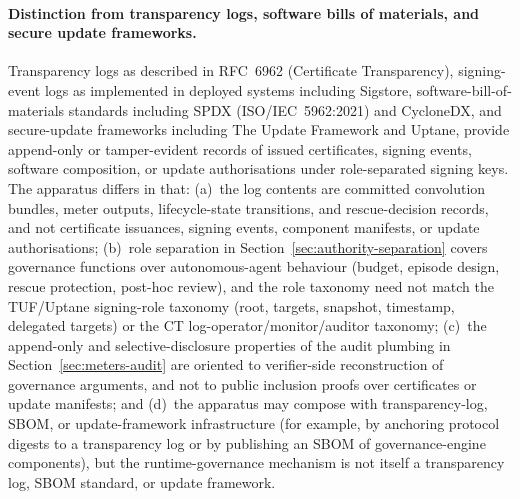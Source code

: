 \documentclass[a4paper,12pt]{article}
\newcommand{\cbs}{convolution bundles\xspace}
\begin{document}
\paragraph{Distinction from transparency logs, software bills of
materials, and secure update frameworks.}
Transparency logs as described in RFC~6962 (Certificate
Transparency), signing-event logs as implemented in deployed
systems including Sigstore, software-bill-of-materials standards
including SPDX (ISO/IEC~5962:2021) and CycloneDX, and
secure-update frameworks including The Update Framework and
Uptane, provide append-only or tamper-evident records of issued
certificates, signing events, software composition, or update
authorisations under role-separated signing keys. The apparatus
differs in that: (a)~the log contents are committed \cbs, meter outputs, lifecycle-state transitions, and
rescue-decision records, and not certificate issuances, signing
events, component manifests, or update authorisations;
(b)~role separation in Section~\ref{sec:authority-separation}
covers governance functions over autonomous-agent behaviour
(budget, episode design, rescue protection, post-hoc review),
and the role taxonomy need not match the TUF/Uptane signing-role
taxonomy (root, targets, snapshot, timestamp, delegated targets)
or the CT log-operator/monitor/auditor taxonomy;
(c)~the append-only and selective-disclosure properties of the
audit plumbing in Section~\ref{sec:meters-audit} are oriented to
verifier-side reconstruction of governance arguments, and not to
public inclusion proofs over certificates or update manifests;
and (d)~the apparatus may compose with transparency-log, SBOM, or
update-framework infrastructure (for example, by anchoring
protocol digests to a transparency log or by publishing an SBOM
of governance-engine components), but the runtime-governance
mechanism is not itself a transparency log, SBOM standard, or
update framework.
\end{document}
